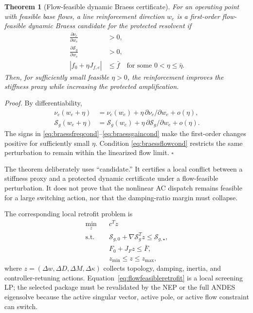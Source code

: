 \documentclass[journal]{IEEEtran}
\newtheorem{theorem}{Theorem}
\begin{document}
\begin{theorem}[Flow-feasible dynamic Braess certificate]
\label{thm:flowbraess}
For an operating point with feasible base flows, a line reinforcement direction $w_e$ is a first-order flow-feasible dynamic Braess candidate for the protected resolvent if
\begin{align}
\frac{\partial \nu_c}{\partial w_e}&>0,
\label{eq:braessfreqcond}\\
\frac{\partial \mathcal{S}_g}{\partial w_e}&>0,
\label{eq:braessgaincond}\\
|f_0+\eta J_{f,e}|&\le \bar f
\quad\text{for some }0<\eta\le\bar\eta .
\label{eq:braessflowcond}
\end{align}
Then, for sufficiently small feasible $\eta>0$, the reinforcement improves the stiffness proxy while increasing the protected amplification.
\end{theorem}
\noindent\emph{Proof.}
By differentiability,
\begin{align}
\nu_c(w_e+\eta)&=\nu_c(w_e)+\eta\,\partial\nu_c/\partial w_e+o(\eta),\\
\mathcal{S}_g(w_e+\eta)&=\mathcal{S}_g(w_e)+\eta\,\partial\mathcal{S}_g/\partial w_e+o(\eta).
\end{align}
The signs in \eqref{eq:braessfreqcond}--\eqref{eq:braessgaincond} make the first-order changes positive for sufficiently small $\eta$. Condition \eqref{eq:braessflowcond} restricts the same perturbation to remain within the linearized flow limit. \hfill$\square$

The theorem deliberately uses ``candidate.'' It certifies a local conflict between a stiffness proxy and a protected dynamic certificate under a flow-feasible perturbation. It does not prove that the nonlinear AC dispatch remains feasible for a large switching action, nor that the damping-ratio margin must collapse.

The corresponding local retrofit problem is
\begin{align}
\min_z\quad & c^Tz
\nonumber\\
\text{s.t.}\quad
& \mathcal{S}_{g,0}+\nabla\mathcal{S}_g^Tz\le \mathcal{S}_{g,\star},
\nonumber\\
& F_0+J_Fz\le \bar F,
\nonumber\\
& z_{\min}\le z\le z_{\max},
\label{eq:flowfeasibleretrofit}
\end{align}
where $z=(\Delta w,\Delta D,\Delta M,\Delta\kappa)$ collects topology, damping, inertia, and controller-retuning actions. Equation~\eqref{eq:flowfeasibleretrofit} is a local screening LP; the selected package must be revalidated by the NEP or the full ANDES eigensolve because the active singular vector, active pole, or active flow constraint can switch.
\end{document}
